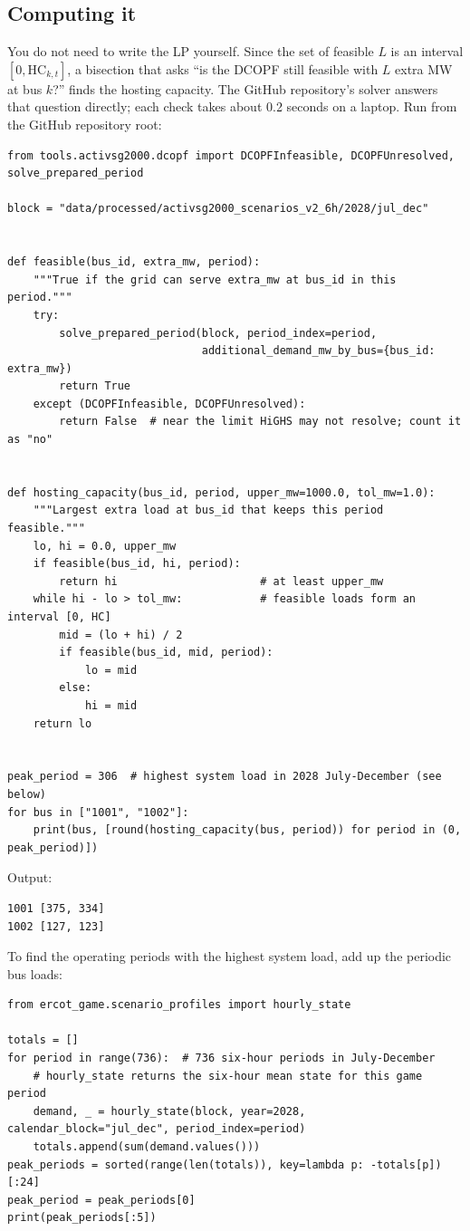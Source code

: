 \documentclass[10pt]{article}
\begin{document}
\subsection{Computing it}
You do not need to write the LP yourself. Since the set of feasible $L$ is an
interval $[0, \mathrm{HC}_{k,t}]$, a bisection that asks ``is the DCOPF still
feasible with $L$ extra MW at bus $k$?'' finds the hosting capacity. The
GitHub repository's solver answers that question directly; each check takes about
0.2 seconds on a laptop. Run from the GitHub repository root:
\begin{lstlisting}[language=tutorialpython]
from tools.activsg2000.dcopf import DCOPFInfeasible, DCOPFUnresolved, solve_prepared_period

block = "data/processed/activsg2000_scenarios_v2_6h/2028/jul_dec"


def feasible(bus_id, extra_mw, period):
    """True if the grid can serve extra_mw at bus_id in this period."""
    try:
        solve_prepared_period(block, period_index=period,
                              additional_demand_mw_by_bus={bus_id: extra_mw})
        return True
    except (DCOPFInfeasible, DCOPFUnresolved):
        return False  # near the limit HiGHS may not resolve; count it as "no"


def hosting_capacity(bus_id, period, upper_mw=1000.0, tol_mw=1.0):
    """Largest extra load at bus_id that keeps this period feasible."""
    lo, hi = 0.0, upper_mw
    if feasible(bus_id, hi, period):
        return hi                      # at least upper_mw
    while hi - lo > tol_mw:            # feasible loads form an interval [0, HC]
        mid = (lo + hi) / 2
        if feasible(bus_id, mid, period):
            lo = mid
        else:
            hi = mid
    return lo


peak_period = 306  # highest system load in 2028 July-December (see below)
for bus in ["1001", "1002"]:
    print(bus, [round(hosting_capacity(bus, period)) for period in (0, peak_period)])
\end{lstlisting}
Output:
\begin{lstlisting}
1001 [375, 334]
1002 [127, 123]
\end{lstlisting}

To find the operating periods with the highest system load, add up the
periodic bus loads:
\begin{lstlisting}[language=tutorialpython]
from ercot_game.scenario_profiles import hourly_state

totals = []
for period in range(736):  # 736 six-hour periods in July-December
    # hourly_state returns the six-hour mean state for this game period
    demand, _ = hourly_state(block, year=2028, calendar_block="jul_dec", period_index=period)
    totals.append(sum(demand.values()))
peak_periods = sorted(range(len(totals)), key=lambda p: -totals[p])[:24]
peak_period = peak_periods[0]
print(peak_periods[:5])
\end{lstlisting}
\end{document}
